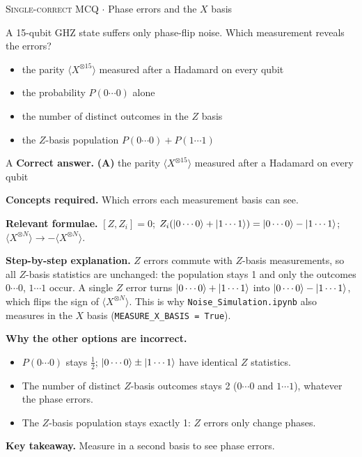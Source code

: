 \documentclass[11pt,a4paper]{article}
\newcommand{\optlabel}[1]{\textbf{(#1)}}
\newcommand{\correctlabel}[1]{\textcolor{okgreen}{\textbf{(#1)}\,\ding{51}}}
\newenvironment{qitem}[1]{\begin{list}{}{\setlength{\leftmargin}{3.3em}\setlength{\labelwidth}{3.1em}%
  \setlength{\labelsep}{0.2em}\setlength{\topsep}{3pt}\setlength{\parsep}{3pt}}\item[\textbf{Q.#1}\hfill]}{\end{list}}
\newcommand{\qsep}{\par\vspace{2pt}{\color{black!15}\hrule}\vspace{4pt}}
\newcommand{\qmeta}[2]{{\footnotesize\color{black!60}\textsc{#1} \;$\cdot$\; #2}\par}
\begin{document}
\begin{qitem}{34}
\qmeta{Single-correct MCQ}{Phase errors and the $X$ basis}
A 15-qubit GHZ state suffers only phase-flip noise. Which measurement reveals the errors?
\begin{itemize}[leftmargin=2.6em, labelsep=0.4em, itemsep=2pt, topsep=3pt]
\item[\correctlabel{A}] the parity $\langle X^{\otimes15}\rangle$ measured after a Hadamard on every qubit
\item[\optlabel{B}] the probability $P(0\cdots0)$ alone
\item[\optlabel{C}] the number of distinct outcomes in the $Z$ basis
\item[\optlabel{D}] the $Z$-basis population $P(0\cdots0) + P(1\cdots1)$
\end{itemize}
\end{qitem}
\begin{solbox}{A}
\textbf{\color{brand}Correct answer.} \textcolor{okgreen}{\textbf{(A)}} the parity $\langle X^{\otimes15}\rangle$ measured after a Hadamard on every qubit

\textbf{\color{brand}Concepts required.} Which errors each measurement basis can see.

\textbf{\color{brand}Relevant formulae.} $[Z, Z_i] = 0$; $Z_i(\ket{0\cdots0} + \ket{1\cdots1}) = \ket{0\cdots0} - \ket{1\cdots1}$; $\langle X^{\otimes N}\rangle \to -\langle X^{\otimes N}\rangle$.

\textbf{\color{brand}Step-by-step explanation.} $Z$ errors commute with $Z$-basis measurements, so all $Z$-basis statistics are unchanged: the population stays 1 and only the outcomes $0\cdots0$,
$1\cdots1$ occur. A single $Z$ error turns $\ket{0\cdots0} + \ket{1\cdots1}$ into $\ket{0\cdots0} - \ket{1\cdots1}$, which flips the sign of $\langle X^{\otimes N}\rangle$.
This is why \texttt{Noise\_Simulation.ipynb} also measures in the $X$ basis (\texttt{MEASURE\_X\_BASIS = True}).

\textbf{\color{brand}Why the other options are incorrect.}
\begin{itemize}[leftmargin=2.4em, itemsep=1pt, topsep=2pt]
\item[\textbf{(B)}] $P(0\cdots0)$ stays $\frac12$; $\ket{0\cdots0} \pm \ket{1\cdots1}$ have identical $Z$ statistics.
\item[\textbf{(C)}] The number of distinct $Z$-basis outcomes stays 2 ($0\cdots0$ and $1\cdots1$), whatever the phase errors.
\item[\textbf{(D)}] The $Z$-basis population stays exactly 1: $Z$ errors only change phases.
\end{itemize}
\textbf{\color{brand}Key takeaway.} Measure in a second basis to see phase errors.
\end{solbox}
\qsep
\end{document}
